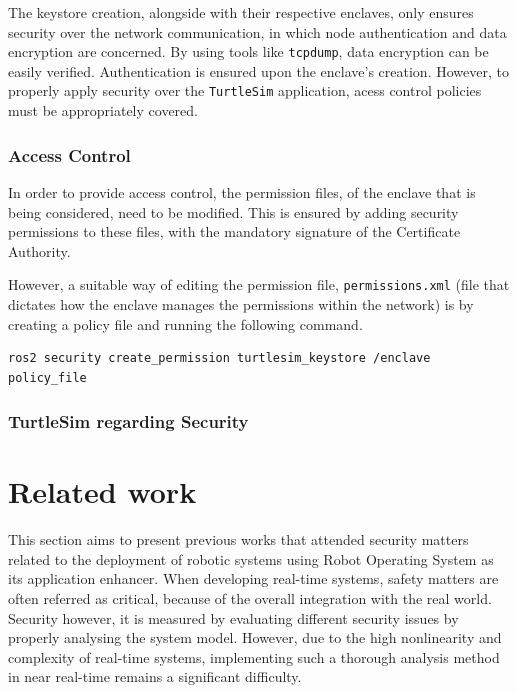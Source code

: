 The keystore creation, alongside with their respective enclaves, only ensures security over the network communication, in which node authentication and data encryption are concerned. By using tools like \texttt{tcpdump}, data encryption can be easily verified. Authentication is ensured upon the enclave's creation. However, to properly apply security over the \texttt{TurtleSim} application, acess control policies must be appropriately covered.

\subsubsection{Access Control}
            
In order to provide access control, the permission files, of the enclave that is being considered, need to be modified. This is ensured by adding security permissions to these files, with the mandatory signature of the Certificate Authority. 
                
However, a suitable way of editing the permission file, \texttt{permissions.xml} (file that dictates how the enclave manages the permissions within the network) is by creating a policy file and running the following command.
                
\begin{lstlisting}[title={Setting permissions into an enclave.}]
ros2 security create_permission turtlesim_keystore /enclave policy_file
\end{lstlisting}

\subsubsection{TurtleSim regarding Security}


\section{Related work}\label{s:ros-relWork}

This section aims to present previous works that attended security matters related to the deployment of robotic systems using Robot Operating System as its application enhancer. When developing real-time systems, safety matters are often referred as critical, because of the overall integration with the real world. Security however, it is measured by evaluating different security issues by properly analysing the system model. However, due to the high nonlinearity and complexity of real-time systems, implementing such a thorough analysis method in near real-time remains a significant difficulty.\cite{diao2009design}

